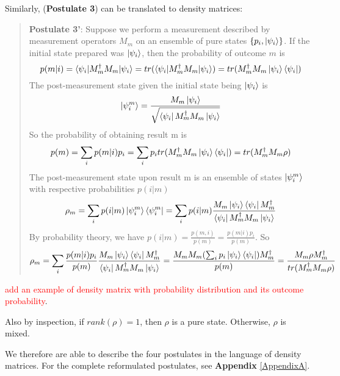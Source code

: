 Similarly, (\textbf{Postulate 3}) can be translated to density matrices:
\begin{quote}
    {\bf{Postulate 3'}}: Suppose we perform a measurement described by measurement operators $M_m$ on an ensemble of pure states $\{p_i, \ket{\psi_i}\}$. If the initial state prepared was $\ket{\psi_i}$, then the probability of outcome $m$ is
    \begin{equation}
        p(m|i)=\braket{\psi_i|M_m^\dagger M_m|\psi_i}=tr(\braket{\psi_i|M_m^\dagger M_m|\psi_i})=tr(M_m^\dagger M_m \ket{\psi_i}\bra{\psi_i})
    \end{equation}
    The post-measurement state given the initial state being $\ket{\psi_i}$ is
    \begin{equation}
        \ket{\psi_i^m}=\frac{M_m \ket{\psi_i}}{\sqrt{\bra{\psi_i}M_m^\dagger M_m \ket{\psi_i}}}
    \end{equation}
    So the probability of obtaining result m is
    \begin{equation}
        p(m)=\sum_i p(m|i)p_i=\sum_i p_i tr(M_m^\dagger M_m \ket{\psi_i}\bra{\psi_i})=tr(M_m^\dagger M_m \rho)
    \end{equation}
    The post-measurement state upon result m is an ensemble of states $\ket{\psi_i^m}$ with respective probabilities $p(i|m)$
    \begin{equation}
        \rho_m = \sum_i p(i|m)\ket{\psi_i^m}\bra{\psi_i^m}=\sum_i p(i|m)\frac{M_m \ket{\psi_i}\bra{\psi_i}M_m^\dagger}{\bra{\psi_i}M_m^\dagger M_m \ket{\psi_i}}
    \end{equation}
    By probability theory, we have $p(i|m)=\frac{p(m,i)}{p(m)}=\frac{p(m|i)p_i}{p(m)}$. So
    \begin{equation}
        \rho_m=\sum_i \frac{p(m|i)p_i}{p(m)}\frac{M_m \ket{\psi_i}\bra{\psi_i}M_m^\dagger}{\bra{\psi_i}M_m^\dagger M_m \ket{\psi_i}}=\frac{M_m M_m (\sum_i p_i \ket{\psi_i}\bra{\psi_i})M_m^\dagger}{p(m)}=\frac{M_m \rho M_m^\dagger}{tr(M_m^\dagger M_m \rho)}
    \end{equation}
\end{quote}



\textcolor{red}{add an example of density matrix with probability distribution and its outcome probability}.



Also by inspection, if $rank(\rho)=1$, then $\rho$ is a pure state. Otherwise, $\rho$ is mixed.

We therefore are able to describe the four postulates in the language of density matrices. For the complete reformulated postulates, see \textbf{Appendix} \ref{AppendixA}.

